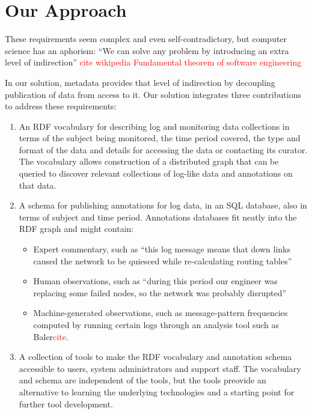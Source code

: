 \section{Our Approach}
\label{s:solution}

These requirements seem complex and even self-contradictory, but
computer science has an aphorism: ``We can solve any problem by
introducing an extra level of indirection''
 \textcolor{red}{cite wikipedia Fundamental theorem of software engineering}

In our solution, metadata provides that level of indirection by 
decoupling publication of data from access to it. Our solution 
integrates three contributions to address these requirements:

\begin{enumerate}
\item An RDF vocabulary for describing log and monitoring data collections
      in terms of the subject being monitored, the time period covered,
      the type and format of the data and details for accessing the data or
      contacting its curator. The vocabulary allows construction of a 
      distributed graph that can be queried to discover relevant collections
      of log-like data and annotations on that data.
      
\item A schema for publishing annotations for log data, in an SQL
	  database, also in terms of subject and time period. Annotations 
      databases fit neatly into the RDF graph and might contain:
      
\begin{itemize}
\item Expert commentary, such as ``this log message means that down links
      caused the network to be quiesced while re-calculating routing tables''      
\item Human observations, such as ``during this period our engineer was 
      replacing some failed nodes, so the network was probably disrupted'' 
\item Machine-generated observations, such as message-pattern frequencies 
      computed by running certain logs through an analysis tool such as 
      Baler\textcolor{red}{cite}.
\end{itemize}

\item A collection of tools to make the RDF vocabulary and annotation 
      schema accessible to users, system administrators and support staff.
      The vocabulary and schema are independent of the tools, but 
      the tools preovide an alternative to learning the underlying 
      technologies and a starting point for further tool development.

\end{enumerate}









